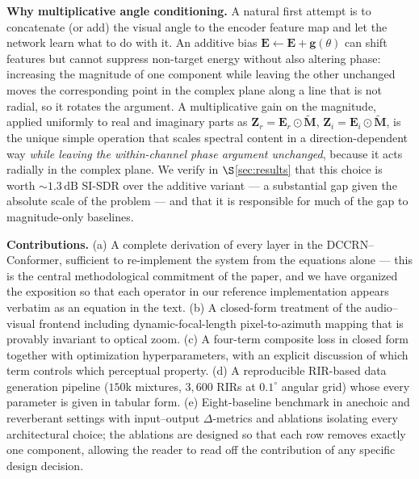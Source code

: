 \documentclass[journal,10pt]{IEEEtran}
\newcommand{\bE}{\mathbf{E}}
\newcommand{\bZ}{\mathbf{Z}}
\newcommand{\bM}{\mathbf{M}}
\newcommand{\bg}{\mathbf{g}}
\begin{document}
\textbf{Why multiplicative angle conditioning.} A natural first attempt is to concatenate (or add) the visual angle to the encoder feature map and let the network learn what to do with it. An additive bias \(\bE\leftarrow\bE+\bg(\theta)\) can shift features but cannot suppress non-target energy without also altering phase: increasing the magnitude of one component while leaving the other unchanged moves the corresponding point in the complex plane along a line that is not radial, so it rotates the argument. A multiplicative gain on the magnitude, applied uniformly to real and imaginary parts as \(\bZ_r=\bE_r\odot\widetilde{\bM}\), \(\bZ_i=\bE_i\odot\widetilde{\bM}\), is the unique simple operation that scales spectral content in a direction-dependent way \emph{while leaving the within-channel phase argument unchanged}, because it acts radially in the complex plane. We verify in \(\S\)\ref{sec:results} that this choice is worth \(\sim\!1.3\,\mathrm{dB}\) SI-SDR over the additive variant --- a substantial gap given the absolute scale of the problem --- and that it is responsible for much of the gap to magnitude-only baselines.

\textbf{Contributions.} (a) A complete derivation of every layer in the DCCRN--Conformer, sufficient to re-implement the system from the equations alone --- this is the central methodological commitment of the paper, and we have organized the exposition so that each operator in our reference implementation appears verbatim as an equation in the text. (b) A closed-form treatment of the audio--visual frontend including dynamic-focal-length pixel-to-azimuth mapping that is provably invariant to optical zoom. (c) A four-term composite loss in closed form together with optimization hyperparameters, with an explicit discussion of which term controls which perceptual property. (d) A reproducible RIR-based data generation pipeline (\(150\)k mixtures, \(3{,}600\) RIRs at \(0.1^\circ\) angular grid) whose every parameter is given in tabular form. (e) Eight-baseline benchmark in anechoic and reverberant settings with input--output \(\Delta\)-metrics and ablations isolating every architectural choice; the ablations are designed so that each row removes exactly one component, allowing the reader to read off the contribution of any specific design decision.
\end{document}
